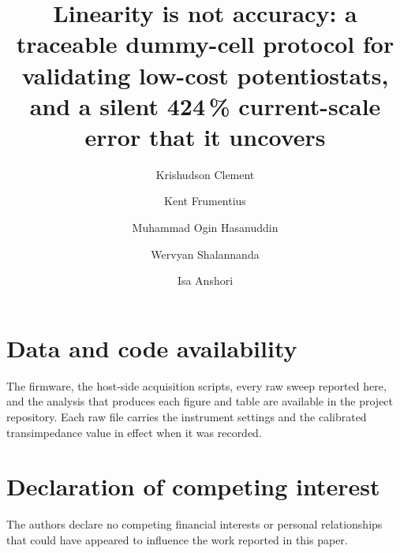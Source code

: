\documentclass[preprint,12pt]{elsarticle}
\begin{document}
\begin{frontmatter}

\title{Linearity is not accuracy: a traceable dummy-cell protocol for
validating low-cost potentiostats, and a silent 424\,\% current-scale error
that it uncovers}

\author[itb]{Krishudson Clement}
\author[itb]{Kent Frumentius}
\author[itb,inha]{Muhammad Ogin Hasanuddin}
\author[itb]{Wervyan Shalannanda}
\author[itb]{Isa Anshori}




\end{frontmatter}







\section*{Data and code availability}
The firmware, the host-side acquisition scripts, every raw sweep reported here,
and the analysis that produces each figure and table are available in the
project repository. Each raw file carries the instrument settings and the
calibrated transimpedance value in effect when it was recorded.

\section*{Declaration of competing interest}
The authors declare no competing financial interests or personal relationships
that could have appeared to influence the work reported in this paper.



\end{document}
